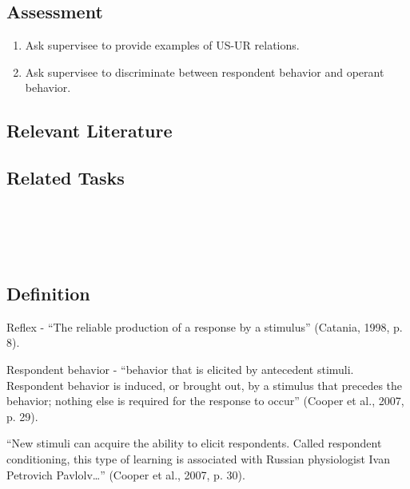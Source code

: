 \subsection{Assessment}
\begin{enumerate}
\item Ask supervisee to provide examples of US-UR relations.
\item Ask supervisee to discriminate between respondent behavior and operant behavior.
%
\end{enumerate}
%
\subsection{Relevant Literature}
\begin{refsection}
\nocite{test,alang2017police,clayton2018black}
\printbibliography[heading=none]
\end{refsection}
%
\subsection{Related Tasks}
\fourFKFourteen{}\\
\fourFKFifteen{}\\
\fourFKSixteen{}\\
%
%
%
%
%
%
\section{\fourFKFourteen{}}
\subsection{Definition} 
Reflex - ``The reliable production of a response by a stimulus'' (Catania, 1998, p. 8).

Respondent behavior - ``behavior that is elicited by antecedent stimuli. Respondent behavior is induced, or brought out, by a stimulus that precedes the behavior; nothing else is required for the response to occur'' (Cooper et al., 2007, p. 29).

``New stimuli can acquire the ability to elicit respondents. Called respondent conditioning, this type of learning is associated with Russian physiologist Ivan Petrovich Pavlolv…'' (Cooper et al., 2007, p. 30).

